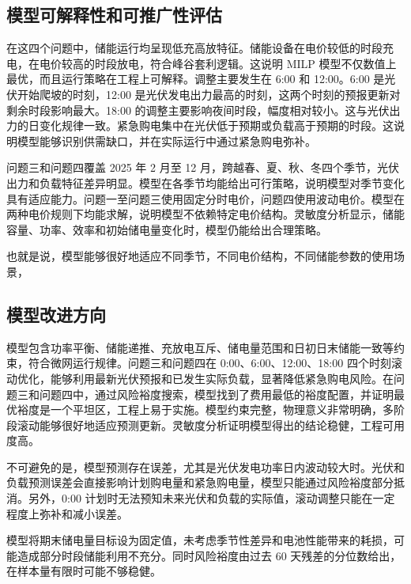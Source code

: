 \documentclass[UTF8]{ctexart}
\begin{document}
    \subsection{模型可解释性和可推广性评估}
    
    在这四个问题中，储能运行均呈现低充高放特征。储能设备在电价较低的时段充电，在电价较高的时段放电，符合峰谷套利逻辑。这说明 MILP 模型不仅数值上最优，而且运行策略在工程上可解释。调整主要发生在 6:00 和 12:00。6:00 是光伏开始爬坡的时刻，12:00 是光伏发电出力最高的时刻，这两个时刻的预报更新对剩余时段影响最大。18:00 的调整主要影响夜间时段，幅度相对较小。这与光伏出力的日变化规律一致。紧急购电集中在光伏低于预期或负载高于预期的时段。这说明模型能够识别供需缺口，并在实际运行中通过紧急购电弥补。\par
    
    问题三和问题四覆盖 2025 年 2 月至 12 月，跨越春、夏、秋、冬四个季节，光伏出力和负载特征差异明显。模型在各季节均能给出可行策略，说明模型对季节变化具有适应能力。问题一至问题三使用固定分时电价，问题四使用波动电价。模型在两种电价规则下均能求解，说明模型不依赖特定电价结构。灵敏度分析显示，储能容量、功率、效率和初始储电量变化时，模型仍能给出合理策略。\par
    
    也就是说，模型能够很好地适应不同季节，不同电价结构，不同储能参数的使用场景，\par
    
    \subsection{模型改进方向}
    
    模型包含功率平衡、储能递推、充放电互斥、储电量范围和日初日末储能一致等约束，符合微网运行规律。问题三和问题四在 0:00、6:00、12:00、18:00 四个时刻滚动优化，能够利用最新光伏预报和已发生实际负载，显著降低紧急购电风险。在问题三和问题四中，通过风险裕度搜索，模型找到了费用最低的裕度配置，并证明最优裕度是一个平坦区，工程上易于实施。模型约束完整，物理意义非常明确，多阶段滚动能够很好地适应预测更新。灵敏度分析证明模型得出的结论稳健，工程可用度高。\par
    
    不可避免的是，模型预测存在误差，尤其是光伏发电功率日内波动较大时。光伏和负载预测误差会直接影响计划购电量和紧急购电量，模型只能通过风险裕度部分抵消。另外，0:00 计划时无法预知未来光伏和负载的实际值，滚动调整只能在一定程度上弥补和减小误差。\par
    
    模型将期末储电量目标设为固定值，未考虑季节性差异和电池性能带来的耗损，可能造成部分时段储能利用不充分。同时风险裕度由过去 60 天残差的分位数给出，在样本量有限时可能不够稳健。\par
    
\end{document}
